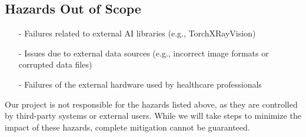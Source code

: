 \documentclass{article}
\begin{document}
\subsection{Hazards Out of Scope}
\begin{itemize}
    \item[-] Failures related to external AI libraries (e.g., TorchXRayVision)
    \item[-] Issues due to external data sources (e.g., incorrect image formats or corrupted data files)
    \item[-] Failures of the external hardware used by healthcare professionals
\end{itemize}
Our project is not responsible for the hazards listed above, as they are controlled by third-party systems or external users. While we will take steps to minimize the impact of these hazards, complete mitigation cannot be guaranteed.
\end{document}
